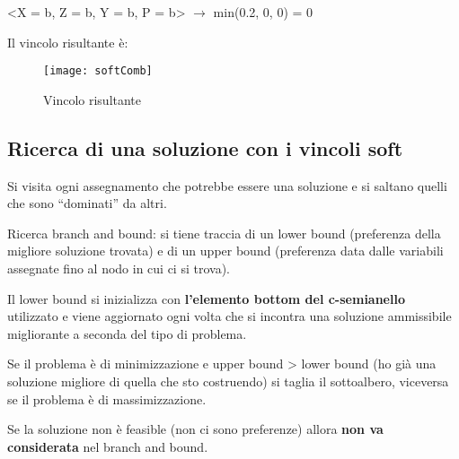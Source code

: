 <X = b, Z = b, Y = b, P = b> $\rightarrow$ min(0.2, 0, 0) = 0

Il vincolo risultante è:

\begin{figure}[H]
\centering
\texttt{[image: softComb]}
\caption{Vincolo risultante}
\end{figure}

\subsection{Ricerca di una soluzione con i vincoli soft}

Si visita ogni assegnamento che potrebbe essere una soluzione e si saltano
quelli che sono ``dominati'' da altri.

Ricerca branch and bound: si tiene traccia di un lower bound (preferenza
della migliore soluzione trovata) e di un upper bound (preferenza data dalle
variabili assegnate fino al nodo in cui ci si trova).

Il lower bound si inizializza con \textbf{l'elemento bottom del c-semianello}
utilizzato e viene aggiornato ogni volta che si incontra una soluzione
ammissibile migliorante a seconda del tipo di problema.

Se il problema è di minimizzazione e upper bound > lower bound (ho già una
soluzione migliore di quella che sto costruendo) si taglia il
sottoalbero, viceversa se il problema è di massimizzazione.

Se la soluzione non è feasible (non ci sono preferenze) allora
\textbf{non va considerata} nel branch and bound.

